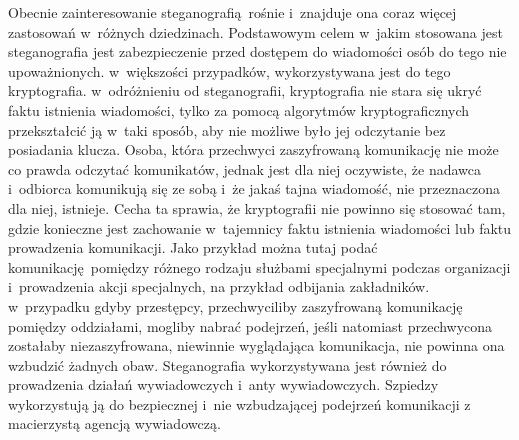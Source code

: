 \documentclass[a4paper, twoside, 12pt]{report}
\begin{document}
        Obecnie zainteresowanie steganografią rośnie i~znajduje ona coraz więcej
        zastosowań w~różnych dziedzinach. Podstawowym celem w~jakim stosowana jest
        steganografia jest zabezpieczenie przed dostępem do wiadomości osób do tego nie
        upoważnionych. w~większości przypadków, wykorzystywana jest do tego
        kryptografia. w~odróżnieniu od steganografii, kryptografia nie stara się
        ukryć faktu istnienia wiadomości, tylko za pomocą algorytmów kryptograficznych
        przekształcić ją w~taki sposób, aby nie możliwe było jej odczytanie bez posiadania
        klucza. Osoba, która przechwyci zaszyfrowaną komunikację nie może co prawda
        odczytać komunikatów, jednak jest dla niej oczywiste, że nadawca i~odbiorca
        komunikują się ze sobą i~że jakaś tajna wiadomość, nie przeznaczona dla niej,
        istnieje.\cite{DIGITALWATERMARKING} Cecha ta sprawia, że kryptografii nie
        powinno się stosować tam, gdzie konieczne jest zachowanie w~tajemnicy
        faktu istnienia wiadomości lub faktu prowadzenia komunikacji. Jako przykład
        można tutaj podać komunikację pomiędzy różnego rodzaju służbami specjalnymi
        podczas organizacji i~prowadzenia akcji specjalnych, na przykład odbijania zakładników.
        w~przypadku gdyby przestępcy, przechwyciliby zaszyfrowaną komunikację
        pomiędzy oddziałami, mogliby nabrać podejrzeń, jeśli natomiast przechwycona
        zostałaby niezaszyfrowana, niewinnie wyglądająca komunikacja, nie powinna ona
        wzbudzić żadnych obaw. Steganografia wykorzystywana jest również do prowadzenia
        działań wywiadowczych i~anty wywiadowczych. Szpiedzy wykorzystują ją do
        bezpiecznej i~nie wzbudzającej podejrzeń komunikacji z macierzystą agencją
        wywiadowczą.
\end{document}
